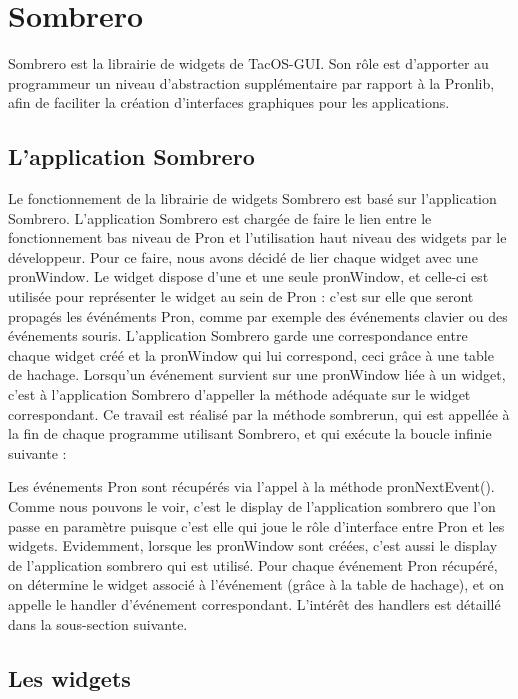 \section{Sombrero}

Sombrero est la librairie de widgets de TacOS-GUI.
Son rôle est d'apporter au programmeur un niveau d'abstraction supplémentaire par rapport à la Pronlib, afin de faciliter la création d'interfaces graphiques pour les applications.

\subsection{L'application Sombrero}

Le fonctionnement de la librairie de widgets Sombrero est basé sur l'application Sombrero.
L'application Sombrero est chargée de faire le lien entre le fonctionnement bas niveau de Pron et l'utilisation haut niveau des widgets par le développeur.
Pour ce faire, nous avons décidé de lier chaque widget avec une pronWindow.
Le widget dispose d'une et une seule pronWindow, et celle-ci est utilisée pour représenter le widget au sein de Pron : c'est sur elle que seront propagés les événéments Pron, comme par exemple des événements clavier ou des événements souris. 
L'application Sombrero garde une correspondance entre chaque widget créé et la pronWindow qui lui correspond, ceci grâce à une table de hachage.
Lorsqu'un événement survient sur une pronWindow liée à un widget, c'est à l'application Sombrero d'appeller la méthode adéquate sur le widget correspondant.
Ce travail est réalisé par la méthode sombrerun, qui est appellée à la fin de chaque programme utilisant Sombrero, et qui exécute la boucle infinie suivante :



Les événements Pron sont récupérés via l'appel à la méthode pronNextEvent().
Comme nous pouvons le voir, c'est le display de l'application sombrero que l'on passe en paramètre puisque c'est elle qui joue le rôle d'interface entre Pron et les widgets.
Evidemment, lorsque les pronWindow sont créées, c'est aussi le display de l'application sombrero qui est utilisé.
Pour chaque événement Pron récupéré, on détermine le widget associé à l'événement (grâce à la table de hachage), et on appelle le handler d'événement correspondant.
L'intérêt des handlers est détaillé dans la sous-section suivante.

\subsection{Les widgets}

